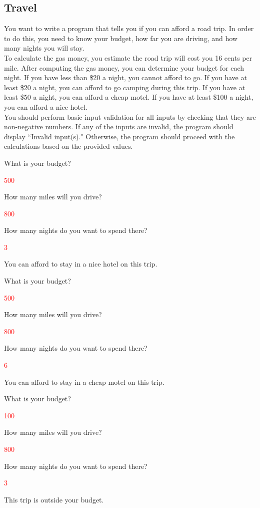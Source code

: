 \subsection{Travel}

You want to write a program that tells you if you can afford a road trip. In order to do this, you need to know your budget, how far you are driving, and how many nights you will stay. \\

To calculate the gas money, you estimate the road trip will cost you 16 cents per mile. After computing the gas money, you can determine your budget for each night. If you have less than \$20 a night, you cannot afford to go. If you have at least \$20 a night, you can afford to go camping during this trip. If you have at least \$50 a night, you can afford a cheap motel. If you have at least \$100 a night, you can afford a nice hotel. \\

You should perform basic input validation for all inputs by checking that they are non-negative numbers. If any of the inputs are invalid, the program should display ``Invalid input(s)." Otherwise, the program should proceed with the calculations based on the provided values.

\begin{sample}
What is your budget?

\textcolor{red}{500}

How many miles will you drive?

\textcolor{red}{800}

How many nights do you want to spend there?

\textcolor{red}{3}

You can afford to stay in a nice hotel on this trip.
\end{sample}

\begin{sample}
What is your budget?

\textcolor{red}{500}

How many miles will you drive?

\textcolor{red}{800}

How many nights do you want to spend there?

\textcolor{red}{6}

You can afford to stay in a cheap motel on this trip.
\end{sample}

\begin{sample}
What is your budget?

\textcolor{red}{100}

How many miles will you drive?

\textcolor{red}{800}

How many nights do you want to spend there?

\textcolor{red}{3}

This trip is outside your budget.
\end{sample}


